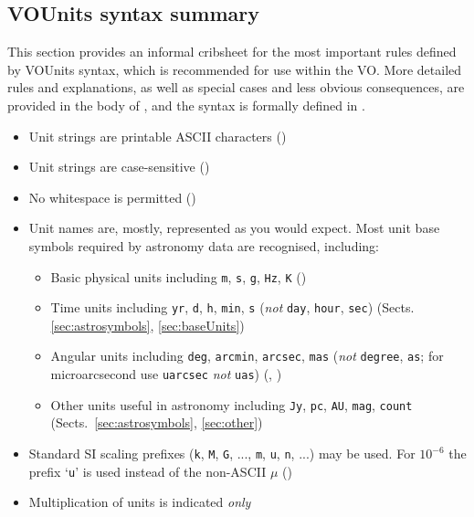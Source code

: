 \documentclass[11pt,a4paper]{ivoa}
\newcommand{\unit}[1]{\texttt{\small\color{orange}#1}}
\begin{document}
\subsection{VOUnits syntax summary\label{sec:cribsheet}}

This section provides an informal cribsheet for the most important
rules defined by VOUnits syntax, which is recommended for use
within the VO.
More detailed rules and explanations, as well as special cases
and less obvious consequences,
are provided in the body of ,
and the syntax is formally defined in .
\begin{itemize}
\item Unit strings are printable ASCII characters ()
\item Unit strings are case-sensitive ()
\item No whitespace is permitted ()
\item Unit names are, mostly, represented as you would expect.
      Most unit base symbols required by astronomy data are recognised,
      including:
  \begin{itemize}
    \item Basic physical units including
          \unit{m}, \unit{s}, \unit{g}, \unit{Hz}, \unit{K}
          ()
    \item Time units including
          \unit{yr}, \unit{d}, \unit{h}, \unit{min}, \unit{s}
          ({\em not\/} {\tt day}, {\tt hour}, {\tt sec})
          (Sects. \ref{sec:astrosymbols}, \ref{sec:baseUnits})
    \item Angular units including
          \unit{deg}, \unit{arcmin}, \unit{arcsec}, \unit{mas}
          ({\em not\/} {\tt degree}, {\tt as};
          for microarcsecond use \unit{uarcsec} {\em not\/} {\tt uas})
          (, )
    \item Other units useful in astronomy including
          \unit{Jy}, \unit{pc}, \unit{AU}, \unit{mag},
          \unit{count}
          (Sects.\ \ref{sec:astrosymbols}, \ref{sec:other})
  \end{itemize}
\item Standard SI scaling prefixes
      (\unit{k}, \unit{M}, \unit{G}, ..., \unit{m}, \unit{u}, \unit{n}, ...)
      may be used.
      For $10^{-6}$ the prefix `\unit{u}'
      is used instead of the non-ASCII $\mu$
      ()
\item Multiplication of units is indicated {\em only\/}

\end{itemize}
\end{document}
